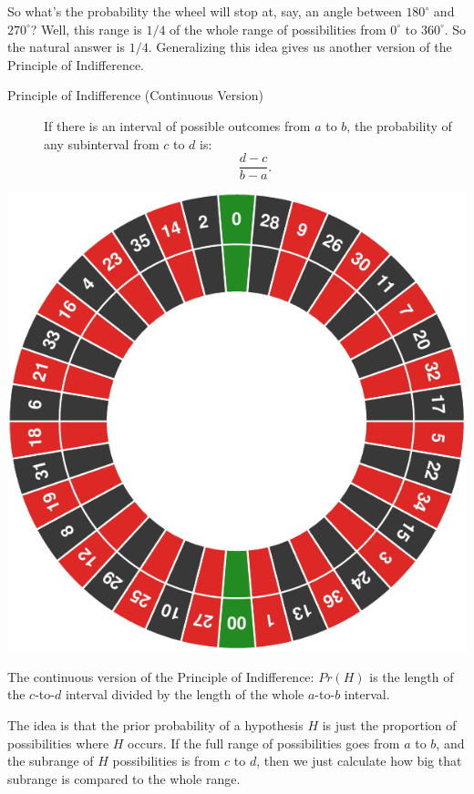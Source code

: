 \documentclass[justified]{tufte-book}
\newcommand{\degr}{^{\circ}}
\theoremstyle{definition}
\theoremstyle{definition}
\theoremstyle{definition}
\theoremstyle{definition}
\theoremstyle{remark}
\begin{document}
So what's the probability the wheel will stop at, say, an angle between \(180\degr\) and \(270\degr\)? Well, this range is \(1/4\) of the whole range of possibilities from \(0\degr\) to \(360\degr\). So the natural answer is \(1/4\). Generalizing this idea gives us another version of the Principle of Indifference.

\begin{description}
\item[Principle of Indifference (Continuous Version)]
If there is an interval of possible outcomes from \(a\) to \(b\), the probability of any subinterval from \(c\) to \(d\) is: \[\frac{d-c}{b-a}.\]
\end{description}

\begin{marginfigure}
\includegraphics{_main_files/figure-latex/unnamed-chunk-135-1} \caption[The continuous version of the Principle of Indifference]{The continuous version of the Principle of Indifference: $Pr(H)$ is the length of the $c$-to-$d$ interval divided by the length of the whole $a$-to-$b$ interval.}\label{fig:unnamed-chunk-135}
\end{marginfigure}

The idea is that the prior probability of a hypothesis \(H\) is just the proportion of possibilities where \(H\) occurs. If the full range of possibilities goes from \(a\) to \(b\), and the subrange of \(H\) possibilities is from \(c\) to \(d\), then we just calculate how big that subrange is compared to the whole range.
\end{document}
